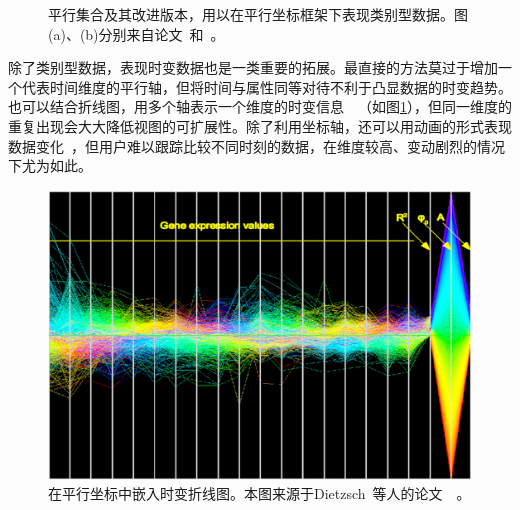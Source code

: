 \documentclass[12pt,twocolumn]{article}
\begin{document}
\begin{figure}[!htb]
\centering
{}
\caption{平行集合及其改进版本，用以在平行坐标框架下表现类别型数据。图(a)、(b)分别来自论文~\citep{kosara2006parallel}和~\citep{hofmann2013common}。}
\end{figure}

除了类别型数据，表现时变数据也是一类重要的拓展。最直接的方法莫过于增加一个代表时间维度的平行轴，但将时间与属性同等对待不利于凸显数据的时变趋势。也可以结合折线图，用多个轴表示一个维度的时变信息~\citep{edsall2003parallel}~\citep{dietzsch2009spray}（如图\ref{fig:PC_Data_Time1}），但同一维度的重复出现会大大降低视图的可扩展性。除了利用坐标轴，还可以用动画的形式表现数据变化~\citep{barlow2004animator}，但用户难以跟踪比较不同时刻的数据，在维度较高、变动剧烈的情况下尤为如此。

\begin{figure}[!htb]
\centering
\includegraphics[width=0.9\linewidth]{images/PC_Data_Time1.eps}
\caption{\label{fig:PC_Data_Time1}在平行坐标中嵌入时变折线图。本图来源于Dietzsch~等人的论文~\citep{dietzsch2009spray}~。
}
\end{figure}
\end{document}
